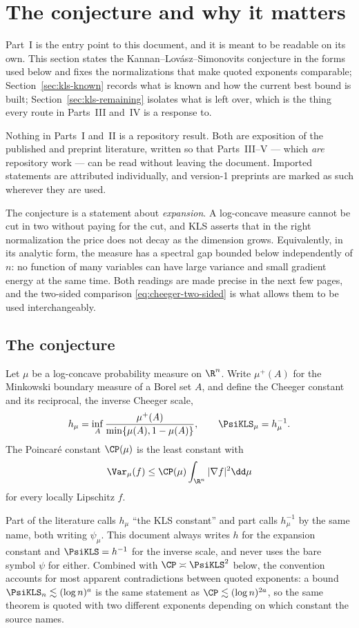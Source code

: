 \documentclass[../../main.tex]{subfiles}
\begin{document}
\section{The conjecture and why it matters}
\label{sec:kls-orientation}

Part~I is the entry point to this document, and it is meant to be readable on its own. This
section states the Kannan--Lov\'asz--Simonovits conjecture in the forms used below and fixes the
normalizations that make quoted exponents comparable;
Section~\ref{sec:kls-known} records what is known and how the current best bound is built;
Section~\ref{sec:kls-remaining} isolates what is left over, which is the thing every route in
Parts~III and~IV is a response to.

Nothing in Parts~I and~II is a repository result. Both are exposition of the published and
preprint literature, written so that Parts~III--V --- which \emph{are} repository work --- can be
read without leaving the document. Imported statements are attributed individually, and version-1
preprints are marked as such wherever they are used.

The conjecture is a statement about \emph{expansion}. A log-concave measure cannot be cut in two
without paying for the cut, and KLS asserts that in the right normalization the price does not
decay as the dimension grows. Equivalently, in its analytic form, the measure has a spectral gap
bounded below independently of $n$: no function of many variables can have large variance and
small gradient energy at the same time. Both readings are made precise in the next few pages, and
the two-sided comparison \eqref{eq:cheeger-two-sided} is what allows them to be used
interchangeably.

\subsection{The conjecture}
\label{subsec:kls-conjecture}

Let $\mu$ be a log-concave probability measure on $\R^n$. Write $\mu^+(A)$ for the Minkowski
boundary measure of a Borel set $A$, and define the Cheeger constant and its reciprocal, the
inverse Cheeger scale,
\[
  h_\mu=\inf_{A}\frac{\mu^+(A)}{\min\{\mu(A),1-\mu(A)\}},
  \qquad
  \PsiKLS_\mu=h_\mu^{-1}.
\]
The Poincar\'e constant $\CP(\mu)$ is the least constant with
\[
  \Var_\mu(f)\le\CP(\mu)\int_{\R^n}|\nabla f|^2\dd\mu
\]
for every locally Lipschitz $f$.

\begin{warning}
\label{rem:psi-convention}
Part of the literature calls $h_\mu$ ``the KLS constant'' and part calls $h_\mu^{-1}$ by the same
name, both writing $\psi_\mu$. This document always writes $h$ for the expansion constant and
$\PsiKLS=h^{-1}$ for the inverse scale, and never uses the bare symbol $\psi$ for either.
Combined with $\CP\asymp\PsiKLS^2$ below, the convention accounts for most apparent
contradictions between quoted exponents: a bound $\PsiKLS_n\lesssim(\log n)^{a}$ is the same
statement as $\CP\lesssim(\log n)^{2a}$, so the same theorem is quoted with two different
exponents depending on which constant the source names.
\end{warning}
\end{document}
